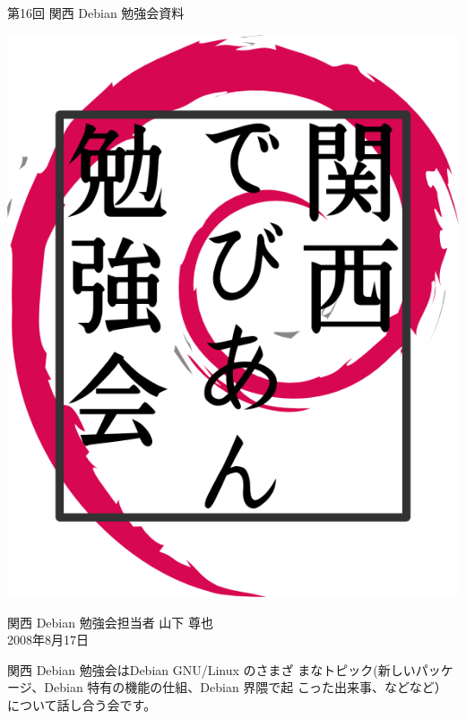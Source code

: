\documentclass[mingoth,a4paper]{jsarticle}
\newcommand{\debmtgyear}{2008}
\newcommand{\debmtgdate}{17}
\newcommand{\debmtgmonth}{8}
\newcommand{\debmtgnumber}{16}
\begin{document}
\begin{titlepage}


 第\debmtgnumber{}回 関西 Debian 勉強会資料

\vspace{2cm}

\begin{center}
\includegraphics{image200802/kansaidebianlogo.png}
\end{center}

\begin{flushright}
\hfill{}関西 Debian 勉強会担当者 山下 尊也\\
\hfill{}\debmtgyear{}年\debmtgmonth{}月\debmtgdate{}日
\end{flushright}

\thispagestyle{empty}
\end{titlepage}

 
 関西 Debian 勉強会はDebian GNU/Linux のさまざ
 まなトピック(新しいパッケージ、Debian 特有の機能の仕組、Debian 界隈で起
 こった出来事、などなど）について話し合う会です。
\end{document}
